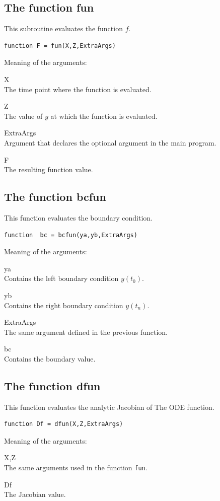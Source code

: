 \documentclass[<options>]{article}
\begin{document}
\subsection{The function fun}\label{fun}
This subroutine evaluates the function $f.$
\begin{verbatim}
function F = fun(X,Z,ExtraArgs)
\end{verbatim}
Meaning of the arguments:
\begin{list}
{}{%
  \renewcommand\makelabel[1]{\texttt{#1}\hfill}
}
\item[X]\ \\
The time point where the function is evaluated.
\item[Z]\ \\
The value of $y$ at which the function is evaluated.
\item[ExtraArgs]\ \\
Argument that declares the optional argument in the main program.
\item[F]\ \\
The resulting function value.
\end{list}
\subsection{The function bcfun}\label{bcfun}
This function evaluates the boundary condition.
\begin{verbatim}
function  bc = bcfun(ya,yb,ExtraArgs)
\end{verbatim}
Meaning of the arguments:
\begin{list}
{}{%
  \renewcommand\makelabel[1]{\texttt{#1}\hfill}
}
\item[ya]\ \\
Contains the left boundary condition $y(t_{0}).$
\item[yb]\ \\
Contains the right boundary condition $y(t_{n}).$
\item[ExtraArgs]\ \\
The same argument defined in the previous function.
\item[bc]\ \\
Contains the boundary value.
\end{list}
\subsection{The function dfun}\label{dfun}
This function evaluates the analytic Jacobian of The ODE function.
\begin{verbatim}
function Df = dfun(X,Z,ExtraArgs)
\end{verbatim}
Meaning of the arguments:
\begin{list}
{}{%
  \renewcommand\makelabel[1]{\texttt{#1}\hfill}
}
\item[X,Z]\ \\
The same arguments used in the function \texttt{fun}.

\item[Df]\ \\
The Jacobian value.
\end{list}
\end{document}
